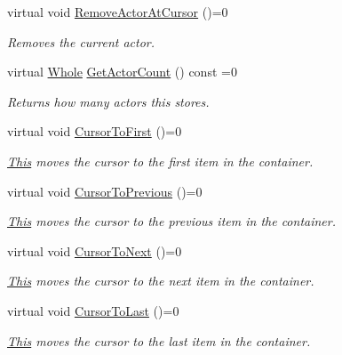 \begin{DoxyCompactItemize}
virtual void \hyperlink{classphys_1_1ActorContainerBase_a60f37a056e8750f3b389c5ceed14520c}{RemoveActorAtCursor} ()=0
\begin{DoxyCompactList}\small\item\em Removes the current actor. \item\end{DoxyCompactList}\item 
virtual \hyperlink{namespacephys_a460f6bc24c8dd347b05e0366ae34f34a}{Whole} \hyperlink{classphys_1_1ActorContainerBase_aa5ec651d4634b2d90efe2a76f9d2fbdd}{GetActorCount} () const =0
\begin{DoxyCompactList}\small\item\em Returns how many actors this stores. \item\end{DoxyCompactList}\item 
virtual void \hyperlink{classphys_1_1ActorContainerBase_ab1a44758d7c17e70ff2e0f8de47424c3}{CursorToFirst} ()=0
\begin{DoxyCompactList}\small\item\em \hyperlink{structThis}{This} moves the cursor to the first item in the container. \item\end{DoxyCompactList}\item 
virtual void \hyperlink{classphys_1_1ActorContainerBase_a7c424168c0bbd973b283a083714123b3}{CursorToPrevious} ()=0
\begin{DoxyCompactList}\small\item\em \hyperlink{structThis}{This} moves the cursor to the previous item in the container. \item\end{DoxyCompactList}\item 
virtual void \hyperlink{classphys_1_1ActorContainerBase_a1aa337456a4e74cb5740dbae08778072}{CursorToNext} ()=0
\begin{DoxyCompactList}\small\item\em \hyperlink{structThis}{This} moves the cursor to the next item in the container. \item\end{DoxyCompactList}\item 
virtual void \hyperlink{classphys_1_1ActorContainerBase_afad072e018a04c190e5e5fb93b82b354}{CursorToLast} ()=0
\begin{DoxyCompactList}\small\item\em \hyperlink{structThis}{This} moves the cursor to the last item in the container. \item\end{DoxyCompactList}\item 

\end{DoxyCompactItemize}
